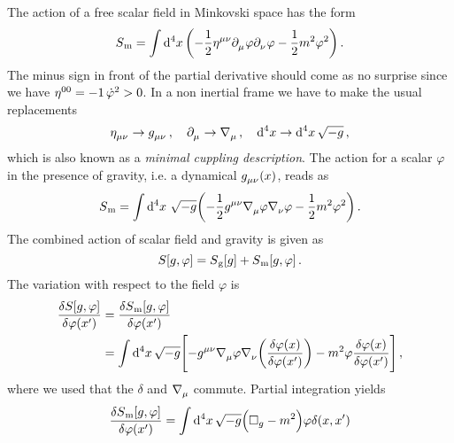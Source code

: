 \begin{example}
The action of a free scalar field in Minkovski space has the form
\begin{equation}
S\textsubscript{m}=\fourint  \left(-\frac{1}{2}\tensor{\eta}{^\mu^\nu}
\tensor{\partial}{_\mu}\varphi\tensor{\partial}{_\nu}\varphi-\frac{1}{2}m^2\varphi^2\right)\,.
\end{equation}
The minus sign in front of the partial derivative should come as no surprise
since we have $\tensor{\eta}{^0^0}=-1\, \dot{\varphi}^2>0$. In a non inertial
frame we have to make the usual replacements
\begin{equation}
\tensor{\eta}{_\mu_\nu}\to \tensor{g}{_\mu_\nu}\, , \quad
\tensor{\partial}{_\mu}\to
\tensor{\nabla}{_\mu}\,, \quad \dif{}^4 x \to \dif{}^4 x\, \sqrt{-g}\, ,
\end{equation}
which is also known as a \emph{minimal cuppling description}. The action for a
scalar $\varphi$ in the presence of gravity, 
i.e. a dynamical $\tensor{g}{_\mu_\nu}(x)$, reads as
\begin{equation}
S\textsubscript{m}=\fourint\, 
\sqrt{-g}\left(-\frac{1}{2}\tensor{g}{^\mu^\nu} \tensor{\nabla}{_\mu}\varphi\tensor{\nabla}{_\nu}\varphi
-\frac{1}{2}m^2\varphi^2\right)\,.
\end{equation}
 The combined action of scalar field and
gravity is given as
\begin{equation}
S[g,\varphi]=S\textsubscript{g}[g]+S\textsubscript{m}[g,\varphi]\,.
\end{equation}
The variation with respect to the field $\varphi$ is 
\begin{equation}
\begin{split}
\frac{\delta S[g,\varphi]}{\delta
\varphi\left(x'\right)}&=\frac{\delta S\textsubscript{m}[g,\varphi]}{\delta
\varphi\left(x'\right)}\\
&=\fourint\sqrt{-g}\left[-\tensor{g}{^\mu^\nu}
\tensor{\nabla}{_\mu}\varphi\tensor{\nabla}{_\nu}\left(\frac{\delta
\varphi(x)}{\delta \varphi\left(x'\right)}\right)-m^2\varphi\frac{\delta
\varphi(x)}{\delta \varphi\left(x'\right)}\right]\,,
\end{split}
\end{equation}
where we used that the $\delta$ and $\tensor{\nabla}{_\mu}$ commute. Partial
integration yields
\begin{equation}
\begin{split}
\frac{\delta S\textsubscript{m}[g,\varphi]}{\delta \varphi\left(x'\right)}&=\fourint \sqrt{-g}\left(\square_{g}-m^2\right)\varphi\delta(x,x')\\

\end{split}
\end{equation}
\end{example}
